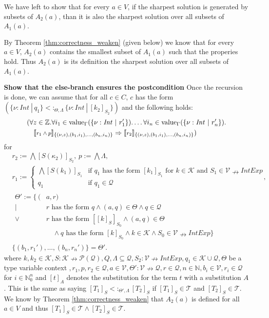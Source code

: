 \documentclass[]{scrbook}
\newcommand{\semantic}[1]{\llbracket \text{\footnotesize\texttt{#1}} \rrbracket}
\theoremstyle{definition}
\theoremstyle{definition}
\theoremstyle{definition}
\theoremstyle{remark}
\begin{document}
We have left to show that for every \(a\in V\), if the sharpest solution
is generated by subsets of \(A_2(a)\), than it is also the sharpest
solution over all subsets of \(A_1(a)\).

By Theorem \ref{thm:correctness_weaken} (given below) we know that for
every \(a\in V\), \(A_2(a)\) contains the smallest subset of \(A_1(a)\)
such that the properies hold. Thus \(A_2(a)\) is its definition the
sharpest solution over all subsets of \(A_1(a)\).

\textbf{Show that the else-branch ensures the postcondition}\newline
Once the recursion is done, we can assume that for all \(c\in C\), \(c\)
has the form
\((\{\nu:\mathit{Int}\ |\ q_1\} <:_{\Theta,\Lambda} \{\nu:\mathit{Int}\ |\ [k_2]_{S_2}\})\)
and the following holds: \[
\begin{aligned}
  &(\forall z \in\mathbb{Z}.\forall i_1\in\text{value}_\Gamma(\{\nu:\mathit{Int}\ |\ r_1'\}).\dots \forall i_n\in\text{value}_\Gamma(\{\nu:\mathit{Int}\ |\ r_n'\}).\\
&\quad\semantic{$r_1\land p$}_{\{(\nu,z),(b_1,i_1),\dots,(b_n,i_n)\}}\Rightarrow \semantic{$r_2$}_{\{(\nu,z),(b_1,i_1),\dots,(b_n,i_n)\}})
\end{aligned}
\] for \[
\begin{aligned}
&r_2 := \bigwedge [S(\kappa_2)]_{S_2},\ p:=\bigwedge\Lambda,\\
&r_1 := \begin{cases}\bigwedge [S(k_1)]_{S_1}&\text{if } q_1 \text{ has the form } [k_1]_{S_1} \text{ for } k\in\mathcal{K}\text{ and } S_1\in\mathcal{V}\nrightarrow\mathit{IntExp}\\
q_1& \text{if }q_1\in\mathcal{Q}
\end{cases},\\
&\begin{aligned}
  \Theta':= \{\ (&a,r)\\
   | \ &r \text{ has the form } q \land (a,q)\in\Theta \land q\in\mathcal{Q}\\
  \lor \ &r \text{ has the form } [[k]_S]_{S_0}\land (a,q)\in\Theta\\
  &\quad\land q \text{ has the form } [k]_{S_0} \land k\in\mathcal{K} \land S_0\in\mathcal{V}\nrightarrow\mathit{IntExp}\}
  \end{aligned}\\
&\{(b_1,r_1'),\dots,(b_n,r_n')\}=\Theta'.
\end{aligned}
\] where
\(k,k_2\in\mathcal{K},S:\mathcal{K}\nrightarrow\mathcal{P}(\mathcal{Q}),Q,\Lambda\subseteq\mathcal{Q},S_2:\mathcal{V}\nrightarrow\mathit{IntExp},q_1\in\mathcal{K}\cup\mathcal{Q}, \Theta\)
be a type variable context
\(,r_1,p,r_2\in\mathcal{Q},a\in\mathcal{V},\Theta':\mathcal{V}\nrightarrow\mathcal{Q},r\in\mathcal{Q},n\in\mathbb{N}, b_i\in\mathcal{V},r_i\in\mathcal{Q}\)
for \(i\in\mathbb{N}_0^n\) and \([t]_A\) denotes the substitution for
the term \(t\) with a substitution \(A\). This is the same as saying
\([T_1]_S <:_{\Theta',\Lambda} [T_2]_S\) if \([T_1]_S \in\mathcal{T}\)
and \([T_2]_S \in\mathcal{T}\). We know by Theorem
\ref{thm:correctness_weaken} that \(A_2(a)\) is defined for all
\(a\in V\) and thus
\([T_1]_S \in\mathcal{T} \land [T_2]_S \in\mathcal{T}\).
\end{document}
